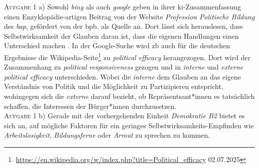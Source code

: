 \textsc{Aufgabe 1} a) \quad
Sowohl \emph{bing} als auch \emph{google} geben in ihrer \gls{ki}-Zusammenfassung einen Enzyklopädie-artigen Beitrag von der Website \emph{Profession Politische Bildung} des \emph{\gls{bap}}, gefördert von der \gls{bpb}, als Quelle an. Dort lässt sich herauslesen, dass Selbstwirksamkeit der Glauben daran ist, dass die eigenen Handlungen einen Unterschied machen \autocite[]{Hufer.2022}. In der Google-Suche wird \gls{zb} auch für die deutschen Ergebnisse die Wikipedia-Seite\footnote{
    \url{https://en.wikipedia.org/w/index.php?title=Political_efficacy} 02.07.2025} 
zu \emph{political efficacy} herangezogen. Dort wird der Zusammenhang zu \emph{political responsiveness} gezogen und in \emph{interne} und \emph{externe} \emph{political efficacy} unterschieden. Wobei die \emph{interne} dem Glauben an das eigene Verständnis von Politik und die Möglichkeit zu Partizipieren entspricht, wohingegen sich die \emph{externe} darauf bezieht, ob Repräsentsant*innen es tatsächlich schaffen, die Interessen der Bürger*innen durchzusetzen. 
\\

\textsc{Aufgabe 1} b) \quad
Gerade mit der vorhergehenden Einheit \emph{Demokratie B2} bietet es sich an, auf mögliche Faktoren für ein geringes Selbstwirksamkeits-Empfinden wie \emph{Arbeitslosigkeit}, \emph{Bildungsferne} oder \emph{Armut} zu sprechen zu kommen. 
\\

